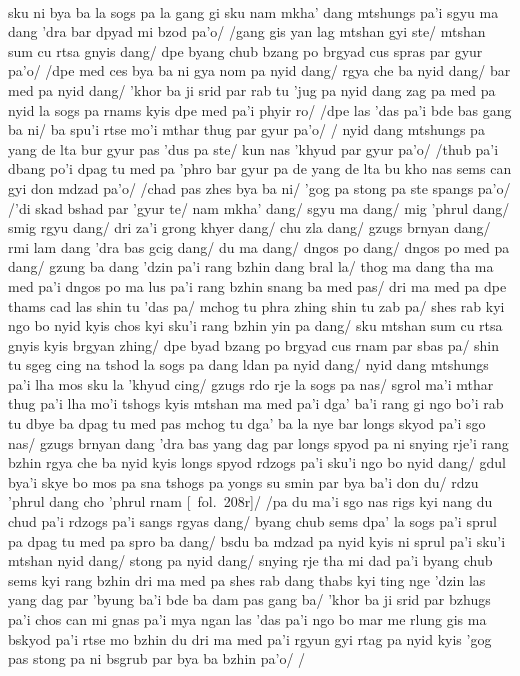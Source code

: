 \documentclass[12pt]{article}
\begin{document}
\textbf{\TVA}\\
sku ni bya ba la sogs pa la gang gi sku nam mkha' dang mtshungs pa'i sgyu ma dang 'dra bar dpyad mi bzod pa'o/ /gang gis yan lag mtshan gyi ste/ mtshan sum cu rtsa gnyis dang/ dpe byang chub bzang po brgyad cus spras par gyur pa'o/ /dpe med ces bya ba ni gya nom pa nyid dang/ rgya che ba nyid dang/ bar med pa nyid dang/ 'khor ba ji srid par rab tu 'jug pa nyid dang zag pa med pa nyid la sogs pa rnams kyis dpe med pa'i phyir ro/ /dpe las 'das pa'i bde bas gang ba ni/ ba spu'i rtse mo'i mthar thug par gyur pa'o/ / nyid dang mtshungs pa yang de lta bur gyur pas 'dus pa ste/ kun nas 'khyud par gyur pa'o/ /thub pa'i dbang po'i dpag tu med pa 'phro bar gyur pa de yang de lta bu kho nas sems can gyi don mdzad pa'o/ /chad pas zhes bya ba ni/ 'gog pa stong pa ste spangs pa'o/ /'di skad bshad par 'gyur te/ nam mkha' dang/ sgyu ma dang/ mig 'phrul dang/ smig rgyu dang/ dri za'i grong khyer dang/ chu zla dang/ gzugs brnyan dang/ rmi lam dang 'dra bas gcig dang/ du ma dang/ dngos po dang/ dngos po med pa dang/ gzung ba dang 'dzin pa'i rang bzhin dang bral la/ thog ma dang tha ma med pa'i dngos po ma lus pa'i rang bzhin snang ba med pas/ dri ma med pa dpe thams cad las shin tu 'das pa/ mchog tu phra zhing shin tu zab pa/ shes rab kyi ngo bo nyid kyis chos kyi sku'i rang bzhin yin pa dang/ sku mtshan sum cu rtsa gnyis kyis brgyan zhing/ dpe byad bzang po brgyad cus rnam par sbas pa/ shin tu sgeg cing na tshod la sogs pa dang ldan pa nyid dang/ nyid dang mtshungs pa'i lha mos sku la 'khyud cing/ gzugs rdo rje la sogs pa nas/ sgrol ma'i mthar thug pa'i lha mo'i tshogs kyis mtshan ma med pa'i dga' ba'i rang gi ngo bo'i rab tu dbye ba dpag tu med pas mchog tu dga' ba la nye bar longs skyod pa'i sgo nas/ gzugs brnyan dang 'dra bas yang dag par longs spyod pa ni snying rje'i rang bzhin rgya che ba nyid kyis longs spyod rdzogs pa'i sku'i ngo bo nyid dang/ gdul bya'i skye bo mos pa sna tshogs pa yongs su smin par bya ba'i don du/ rdzu 'phrul dang cho 'phrul rnam [\TVA\ fol.\ 208r]/ /pa du ma'i sgo nas rigs kyi nang du chud pa'i rdzogs pa'i sangs rgyas dang/ byang chub sems dpa' la sogs pa'i sprul pa dpag tu med pa spro ba dang/ bsdu ba mdzad pa nyid kyis ni sprul pa'i sku'i mtshan nyid dang/ stong pa nyid dang/ snying rje tha mi dad pa'i byang chub sems kyi rang bzhin dri ma med pa shes rab dang thabs kyi ting nge 'dzin las yang dag par 'byung ba'i bde ba dam pas gang ba/ 'khor ba ji srid par bzhugs pa'i chos can mi gnas pa'i mya ngan las 'das pa'i ngo bo mar me rlung gis ma bskyod pa'i rtse mo bzhin du dri ma med pa'i rgyun gyi rtag pa nyid kyis 'gog pas stong pa ni bsgrub par bya ba bzhin pa'o/ /\\
\end{document}
